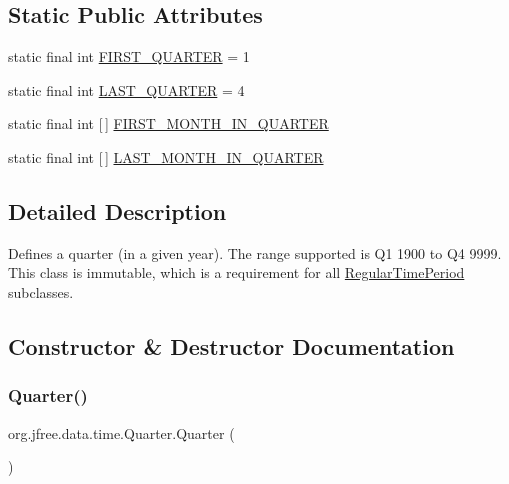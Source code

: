 \subsection*{Static Public Attributes}
\begin{DoxyCompactItemize}
\item 
static final int \mbox{\hyperlink{classorg_1_1jfree_1_1data_1_1time_1_1_quarter_aa8dbd70693278de3dab6c25a59ca179d}{F\+I\+R\+S\+T\+\_\+\+Q\+U\+A\+R\+T\+ER}} = 1
\item 
static final int \mbox{\hyperlink{classorg_1_1jfree_1_1data_1_1time_1_1_quarter_ab163967f1215edb042d9ea06adce419e}{L\+A\+S\+T\+\_\+\+Q\+U\+A\+R\+T\+ER}} = 4
\item 
static final int \mbox{[}$\,$\mbox{]} \mbox{\hyperlink{classorg_1_1jfree_1_1data_1_1time_1_1_quarter_a6c7ccc54923696ab1beb1d80ca0b906a}{F\+I\+R\+S\+T\+\_\+\+M\+O\+N\+T\+H\+\_\+\+I\+N\+\_\+\+Q\+U\+A\+R\+T\+ER}}
\item 
static final int \mbox{[}$\,$\mbox{]} \mbox{\hyperlink{classorg_1_1jfree_1_1data_1_1time_1_1_quarter_a293474be50365a2515393bc50998930d}{L\+A\+S\+T\+\_\+\+M\+O\+N\+T\+H\+\_\+\+I\+N\+\_\+\+Q\+U\+A\+R\+T\+ER}}
\end{DoxyCompactItemize}


\subsection{Detailed Description}
Defines a quarter (in a given year). The range supported is Q1 1900 to Q4 9999. This class is immutable, which is a requirement for all \mbox{\hyperlink{classorg_1_1jfree_1_1data_1_1time_1_1_regular_time_period}{Regular\+Time\+Period}} subclasses. 

\subsection{Constructor \& Destructor Documentation}
\mbox{\label{classorg_1_1jfree_1_1data_1_1time_1_1_quarter_a018ddfb9762c22a460ca04c6aa316d07}} 
\subsubsection{\texorpdfstring{Quarter()}{Quarter()}\hspace{0.1cm}{\footnotesize\ttfamily [1/6]}}
{\footnotesize\ttfamily org.\+jfree.\+data.\+time.\+Quarter.\+Quarter (\begin{DoxyParamCaption}{ }\end{DoxyParamCaption})}

